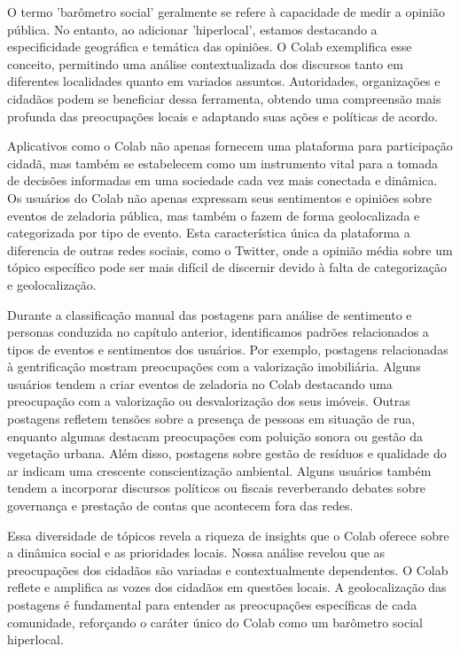 O termo 'barômetro social' geralmente se refere à capacidade de medir a opinião pública. No entanto, ao adicionar 'hiperlocal', estamos destacando a especificidade geográfica e temática das opiniões. O Colab exemplifica esse conceito, permitindo uma análise contextualizada dos discursos tanto em diferentes localidades quanto em variados assuntos. Autoridades, organizações e cidadãos podem se beneficiar dessa ferramenta, obtendo uma compreensão mais profunda das preocupações locais e adaptando suas ações e políticas de acordo. 

Aplicativos como o Colab não apenas fornecem uma plataforma para participação cidadã, mas também se estabelecem como um instrumento vital para a tomada de decisões informadas em uma sociedade cada vez mais conectada e dinâmica. Os usuários do Colab não apenas expressam seus sentimentos e opiniões sobre eventos de zeladoria pública, mas também o fazem de forma geolocalizada e categorizada por tipo de evento. Esta característica única da plataforma a diferencia de outras redes sociais, como o Twitter, onde a opinião média sobre um tópico específico pode ser mais difícil de discernir devido à falta de categorização e geolocalização.

Durante a classificação manual das postagens para análise de sentimento e personas conduzida no capítulo anterior, identificamos padrões relacionados a tipos de eventos e sentimentos dos usuários. Por exemplo, postagens relacionadas à gentrificação mostram preocupações com a valorização imobiliária. Alguns usuários tendem a criar eventos de zeladoria no Colab destacando uma preocupação com a valorização ou desvalorização dos seus imóveis. Outras postagens refletem tensões sobre a presença de pessoas em situação de rua, enquanto algumas destacam preocupações com poluição sonora ou gestão da vegetação urbana. Além disso, postagens sobre gestão de resíduos e qualidade do ar indicam uma crescente conscientização ambiental. Alguns usuários também tendem a incorporar discursos políticos ou fiscais reverberando debates sobre governança e prestação de contas que acontecem fora das redes. 

Essa diversidade de tópicos revela a riqueza de insights que o Colab oferece sobre a dinâmica social e as prioridades locais. Nossa análise revelou que as preocupações dos cidadãos são variadas e contextualmente dependentes. O Colab reflete e amplifica as vozes dos cidadãos em questões locais. A geolocalização das postagens é fundamental para entender as preocupações específicas de cada comunidade, reforçando o caráter único do Colab como um barômetro social hiperlocal.

